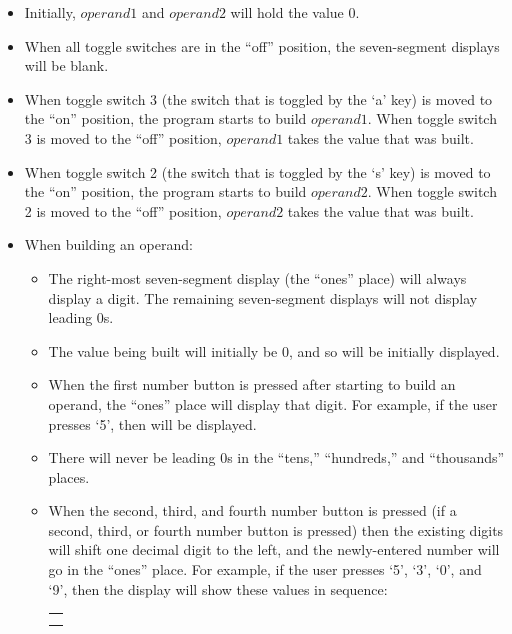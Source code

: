 \begin{itemize}
    \item Initially, $operand1$ and $operand2$ will hold the
        value $0$.
    \item When all toggle switches are in the ``off'' position, the
        seven-segment displays will be blank.
    \item When toggle switch 3 (the switch that is toggled by the `a' key)
        is moved to the ``on'' position, the program starts to build
        $operand1$. When toggle switch 3 is moved to the ``off''
        position, $operand1$ takes the value that was built.
    \item When toggle switch 2 (the switch that is toggled by the `s' key)
        is moved to the ``on'' position, the program starts to build
        $operand2$. When toggle switch 2 is moved to the ``off''
        position, $operand2$ takes the value that was built.
    \item When building an operand:
    \begin{itemize}
        \item The right-most seven-segment display (the ``ones'' place)
            will always display a digit. The remaining seven-segment
            displays will not display leading $0$s.
        \item The value being built will initially be $0$, and so {} will be initially displayed.
        \item When the first number button is pressed after starting to
            build an operand, the ``ones'' place will display that digit.
            For example, if the user presses `5', then {} will be
            displayed.
        \item There will never be leading $0$s in the ``tens,''
            ``hundreds,'' and ``thousands'' places.
        \item When the second, third, and fourth number button is pressed
            (if a second, third, or fourth number button is pressed) then
            the existing digits will shift one decimal digit to the left,
            and the newly-entered number will go in the ``ones'' place. For
            example, if the user presses `5', `3', `0', and `9', then the
            display will show these values in sequence: \\
            \begin{tabular}{r}
            {\dviiseg 0} \\
            {\dviiseg 5} \\

\end{tabular}
\end{itemize}
\end{itemize}
